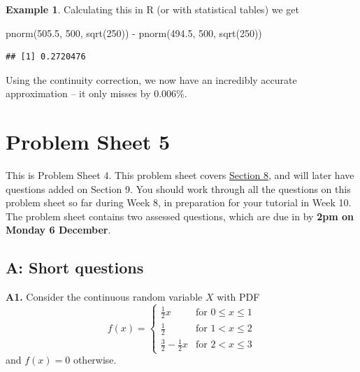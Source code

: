 \documentclass[
  a4paper,
]{book}
\newenvironment{Shaded}{\begin{snugshade}}{\end{snugshade}}
\newcommand{\DecValTok}[1]{\textcolor[rgb]{0.00,0.00,0.81}{#1}}
\newcommand{\FloatTok}[1]{\textcolor[rgb]{0.00,0.00,0.81}{#1}}
\newcommand{\FunctionTok}[1]{\textcolor[rgb]{0.00,0.00,0.00}{#1}}
\newcommand{\NormalTok}[1]{#1}
\newcommand{\SpecialCharTok}[1]{\textcolor[rgb]{0.00,0.00,0.00}{#1}}
\newif\ifcomm\commtrue
\theoremstyle{definition}
\theoremstyle{definition}
\newtheorem{example}{Example}[chapter]
\theoremstyle{definition}
\theoremstyle{definition}
\theoremstyle{remark}
\begin{document}
\begin{example}
Calculating this in R (or with statistical tables) we get

\begin{Shaded}
\begin{Highlighting}[]
\FunctionTok{pnorm}\NormalTok{(}\FloatTok{505.5}\NormalTok{, }\DecValTok{500}\NormalTok{, }\FunctionTok{sqrt}\NormalTok{(}\DecValTok{250}\NormalTok{)) }\SpecialCharTok{{-}} \FunctionTok{pnorm}\NormalTok{(}\FloatTok{494.5}\NormalTok{, }\DecValTok{500}\NormalTok{, }\FunctionTok{sqrt}\NormalTok{(}\DecValTok{250}\NormalTok{))}
\end{Highlighting}
\end{Shaded}

\begin{verbatim}
## [1] 0.2720476
\end{verbatim}

Using the continuity correction, we now have an incredibly accurate approximation -- it only misses by 0.006\%.
\end{example}

\hypertarget{P5}{%
\chapter*{Problem Sheet 5}\label{P5}}

\commfalse

This is Problem Sheet 4. This problem sheet covers \protect\hyperlink{S08-continuous}{Section 8}, and will later have questions added on Section 9. You should work through all the questions on this problem sheet so far during Week 8, in preparation for your tutorial in Week 10. The problem sheet contains two assessed questions, which are due in by \textbf{2pm on Monday 6 December}.

\hypertarget{P5-short}{%
\section*{A: Short questions}\label{P5-short}}

\textbf{A1.} Consider the continuous random variable \(X\) with PDF
\[ f(x) = \begin{cases} \tfrac12x & \text{for $0 \leq x \leq 1$} \\ 
                        \tfrac12 & \text{for $1 < x \leq 2$} \\
                        \tfrac32 - \tfrac12x & \text{for $2 < x \leq 3$} \end{cases} \]
and \(f(x) = 0\) otherwise.
\end{document}
